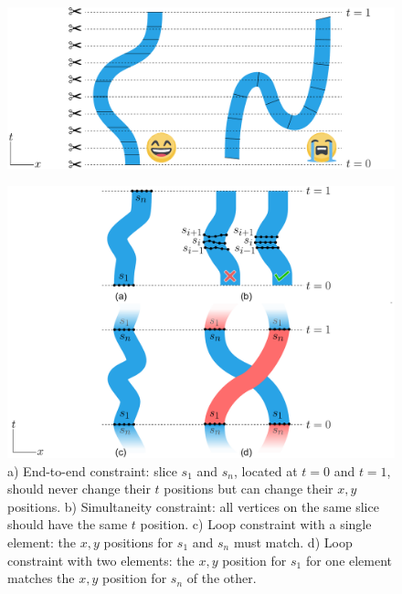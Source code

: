 \begin{figure}
\centering
\includegraphics[width=1.0\textwidth]{figures/animationpak/monotonicity.pdf} 
\caption[An illustration of a desired and an undesired configurations of an element]
{\label{fig_monotonicity} 
}
\end{figure}

\begin{figure}
\centering
\includegraphics[width=1.0\textwidth]{figures/animationpak/constraints.pdf} 
\caption[Constraints]
{\label{fig_animationpak_constraints} 
a) End-to-end constraint: 
slice $s_1$ and $s_n$, located at 
$t = 0$ and $t = 1$,  should never change their $t$ positions but can change their $x, y$ positions. 
b) Simultaneity constraint: all vertices on the same slice should have the same $t$ position.
c) Loop constraint with a single element: the $x,y$ positions for $s_1$ and $s_n$ must match.
d) Loop constraint with two elements: the $x, y$ position for $s_1$  
for one element matches the $x, y$ position for $s_n$ of the other.
}
\end{figure}

